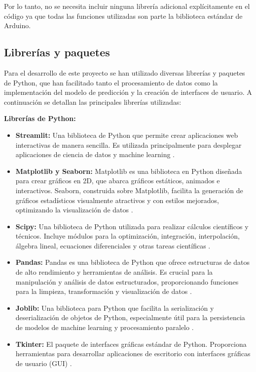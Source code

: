 Por lo tanto, no se necesita incluir ninguna librería adicional explícitamente en el código ya que todas las funciones utilizadas son parte la biblioteca estándar de Arduino.

\subsection{Librerías y paquetes}

Para el desarrollo de este proyecto se han utilizado diversas librerías y paquetes de Python, que han facilitado tanto el procesamiento de datos como la implementación del modelo de predicción y la creación de interfaces de usuario. A continuación se detallan las principales librerías utilizadas:

\textbf{Librerías de Python:}
\begin{itemize}
\item \textbf{Streamlit:} Una biblioteca de Python que permite crear aplicaciones web interactivas de manera sencilla. Es utilizada principalmente para desplegar aplicaciones de ciencia de datos y machine learning \cite{Streamlit}.
\item \textbf{Matplotlib y Seaborn:} Matplotlib es una biblioteca en Python diseñada para crear gráficos en 2D, que abarca gráficos estáticos, animados e interactivos. Seaborn, construida sobre Matplotlib, facilita la generación de gráficos estadísticos visualmente atractivos y con estilos mejorados, optimizando la visualización de datos \cite{matplotlib} \cite{Seaborn}.
\item \textbf{Scipy:} Una biblioteca de Python utilizada para realizar cálculos científicos y técnicos. Incluye módulos para la optimización, integración, interpolación, álgebra lineal, ecuaciones diferenciales y otras tareas científicas \cite{Scipy}.
\item \textbf{Pandas:} Pandas es una biblioteca de Python que ofrece estructuras de datos de alto rendimiento y herramientas de análisis. Es crucial para la manipulación y análisis de datos estructurados, proporcionando funciones para la limpieza, transformación y visualización de datos \cite{Pandas}.
\item \textbf{Joblib:} Una biblioteca para Python que facilita la serialización y deserialización de objetos de Python, especialmente útil para la persistencia de modelos de machine learning y procesamiento paralelo \cite{Joblib}.
\item \textbf{Tkinter:} El paquete de interfaces gráficas estándar de Python. Proporciona herramientas para desarrollar aplicaciones de escritorio con interfaces gráficas de usuario (GUI) \cite{Tkinter}.

\end{itemize}
